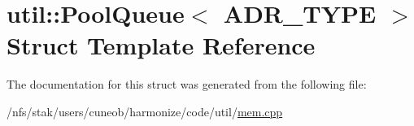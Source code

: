 \hypertarget{structutil_1_1PoolQueue}{\section{util\-:\-:Pool\-Queue$<$ A\-D\-R\-\_\-\-T\-Y\-P\-E $>$ Struct Template Reference}
\label{structutil_1_1PoolQueue}
}


The documentation for this struct was generated from the following file\-:\begin{DoxyCompactItemize}
\item 
/nfs/stak/users/cuneob/harmonize/code/util/\hyperlink{mem_8cpp}{mem.\-cpp}\end{DoxyCompactItemize}

